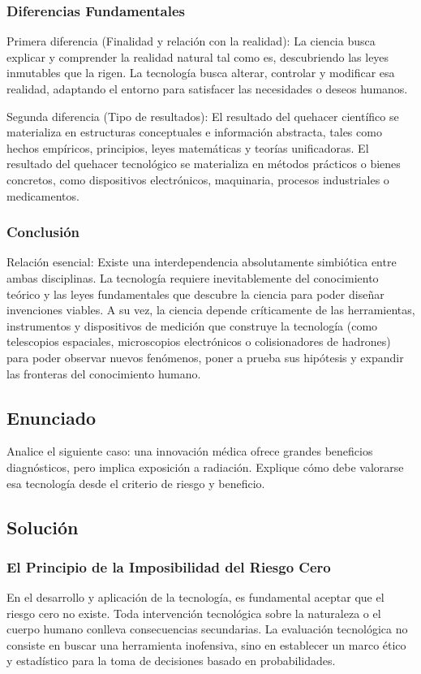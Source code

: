 \documentclass[12pt, a4paper]{article}
\begin{document}
\subsubsection*{Diferencias Fundamentales}
Primera diferencia (Finalidad y relación con la realidad): La ciencia busca explicar y comprender la realidad natural tal como es, descubriendo las leyes inmutables que la rigen. La tecnología busca alterar, controlar y modificar esa realidad, adaptando el entorno para satisfacer las necesidades o deseos humanos. 

Segunda diferencia (Tipo de resultados): El resultado del quehacer científico se materializa en estructuras conceptuales e información abstracta, tales como hechos empíricos, principios, leyes matemáticas y teorías unificadoras. El resultado del quehacer tecnológico se materializa en métodos prácticos o bienes concretos, como dispositivos electrónicos, maquinaria, procesos industriales o medicamentos.

\subsubsection*{Conclusión}
Relación esencial: Existe una interdependencia absolutamente simbiótica entre ambas disciplinas. La tecnología requiere inevitablemente del conocimiento teórico y las leyes fundamentales que descubre la ciencia para poder diseñar invenciones viables. A su vez, la ciencia depende críticamente de las herramientas, instrumentos y dispositivos de medición que construye la tecnología (como telescopios espaciales, microscopios electrónicos o colisionadores de hadrones) para poder observar nuevos fenómenos, poner a prueba sus hipótesis y expandir las fronteras del conocimiento humano.

\newpage

\subsection*{Enunciado}
Analice el siguiente caso: una innovación médica ofrece grandes beneficios diagnósticos, pero implica exposición a radiación. Explique cómo debe valorarse esa tecnología desde el criterio de riesgo y beneficio.

\subsection*{Solución}

\subsubsection*{El Principio de la Imposibilidad del Riesgo Cero}
En el desarrollo y aplicación de la tecnología, es fundamental aceptar que el riesgo cero no existe. Toda intervención tecnológica sobre la naturaleza o el cuerpo humano conlleva consecuencias secundarias. La evaluación tecnológica no consiste en buscar una herramienta inofensiva, sino en establecer un marco ético y estadístico para la toma de decisiones basado en probabilidades.
\end{document}
